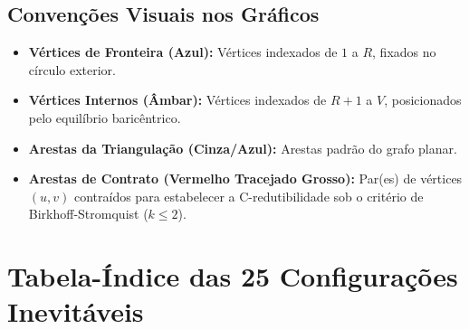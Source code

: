 \documentclass[10pt,a4paper]{article}
\begin{document}
\subsection{Convenções Visuais nos Gráficos}
\begin{itemize}
    \item \textbf{Vértices de Fronteira (Azul):} Vértices indexados de $1$ a $R$, fixados no círculo exterior.
    \item \textbf{Vértices Internos (Âmbar):} Vértices indexados de $R+1$ a $V$, posicionados pelo equilíbrio baricêntrico.
    \item \textbf{Arestas da Triangulação (Cinza/Azul):} Arestas padrão do grafo planar.
    \item \textbf{Arestas de Contrato (Vermelho Tracejado Grosso):} Par(es) de vértices $(u, v)$ contraídos para estabelecer a C-redutibilidade sob o critério de Birkhoff-Stromquist ($k \le 2$).
\end{itemize}

\newpage
\section{Tabela-Índice das 25 Configurações Inevitáveis}
\end{document}
